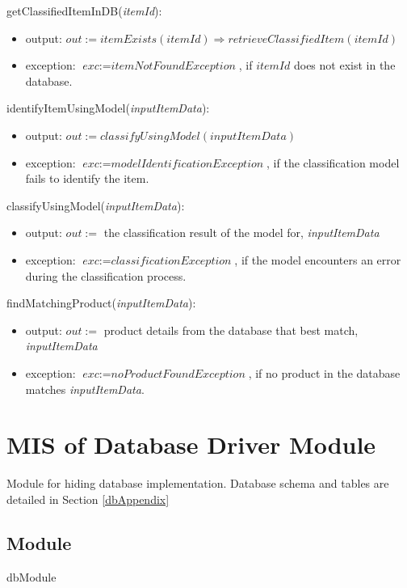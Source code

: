 \documentclass[12pt, titlepage]{article}
\begin{document}
\noindent getClassifiedItemInDB(\textit{itemId}):
\begin{itemize}
  \item output: $out := \textit{itemExists}(\textit{itemId}) \Rightarrow \textit{retrieveClassifiedItem}(\textit{itemId})$
  \item exception: $\textit{exc} := \textit{itemNotFoundException}$, if $\textit{itemId}$ does not exist in the database.
\end{itemize}

\noindent identifyItemUsingModel(\textit{inputItemData}):
\begin{itemize}
  \item output: $out := \textit{classifyUsingModel}(\textit{inputItemData})$
  \item exception: $\textit{exc} := \textit{modelIdentificationException}$, if the classification model fails to identify the item.
\end{itemize}

\noindent classifyUsingModel(\textit{inputItemData}):
\begin{itemize}
  \item output: $out :=$ the classification result of the model for, \textit{inputItemData}
  \item exception: $\textit{exc} := \textit{classificationException}$, if the model encounters an error during the classification process.
\end{itemize}

\noindent findMatchingProduct(\textit{inputItemData}):
\begin{itemize}
  \item output: $out :=$ product details from the database that best match, \textit{inputItemData}
  \item exception: $\textit{exc} := \textit{noProductFoundException}$, if no product in the database matches \textit{inputItemData}.
\end{itemize}

\newpage

\section{MIS of Database Driver Module} \label{mDBDriver}
Module for hiding database implementation. Database schema and tables are detailed in Section \ref{dbAppendix}

\subsection{Module}
dbModule
\end{document}

